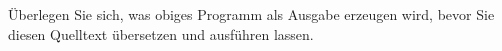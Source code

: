 Überlegen Sie sich, was obiges Programm als Ausgabe erzeugen wird, bevor Sie diesen Quelltext übersetzen und ausführen lassen.

%
%
%
%
%
%
%
%
%
%
%
